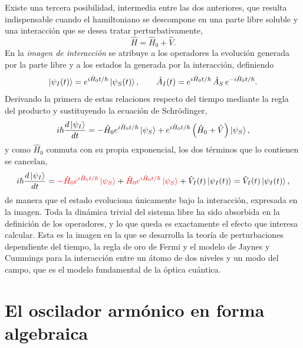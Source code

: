         Existe una tercera posibilidad, intermedia entre las dos anteriores, que resulta indispensable cuando el hamiltoniano se descompone en una parte libre soluble y una interacción que se desea tratar perturbativamente,
        \begin{equation}\label{eq:HamiltonianoDividido}
            \hat{H} = \hat{H}_{0} + \hat{V} .
        \end{equation}
        En la \textit{imagen de interacción} se atribuye a los operadores la evolución generada por la parte libre y a los estados la generada por la interacción, definiendo
        \begin{equation}\label{eq:ImagenInteraccion}
            \ket{\psi_{I}(t)} = e^{i\hat{H}_{0}t/\hbar}\ket{\psi_{S}(t)},
            \qquad
            \hat{A}_{I}(t) = e^{i\hat{H}_{0}t/\hbar}\,\hat{A}_{S}\,e^{-i\hat{H}_{0}t/\hbar} .
        \end{equation}
        Derivando la primera de estas relaciones respecto del tiempo mediante la regla del producto y sustituyendo la ecuación de Schrödinger,
        \begin{equation}\label{eq:EcuacionInteraccion1}
            i\hbar\frac{d\ket{\psi_{I}}}{dt} = -\hat{H}_{0}e^{i\hat{H}_{0}t/\hbar}\ket{\psi_{S}} + e^{i\hat{H}_{0}t/\hbar}\left(\hat{H}_{0}+\hat{V}\right)\ket{\psi_{S}},
        \end{equation}
        y como $\hat{H}_{0}$ conmuta con su propia exponencial, los dos términos que lo contienen se cancelan,
        \begin{equation}\label{eq:EcuacionInteraccion2}
            i\hbar\frac{d\ket{\psi_{I}}}{dt} = \textcolor{red}{-\hat{H}_{0}e^{i\hat{H}_{0}t/\hbar}\ket{\psi_{S}}} + \textcolor{red}{\hat{H}_{0}e^{i\hat{H}_{0}t/\hbar}\ket{\psi_{S}}} + \hat{V}_{I}(t)\ket{\psi_{I}(t)} = \hat{V}_{I}(t)\ket{\psi_{I}(t)},
        \end{equation}
        de manera que el estado evoluciona únicamente bajo la interacción, expresada en la imagen. Toda la dinámica trivial del sistema libre ha sido absorbida en la definición de los operadores, y lo que queda es exactamente el efecto que interesa calcular. Esta es la imagen en la que se desarrolla la teoría de perturbaciones dependiente del tiempo, la regla de oro de Fermi y el modelo de Jaynes y Cummings para la interacción entre un átomo de dos niveles y un modo del campo, que es el modelo fundamental de la óptica cuántica.

\section{El oscilador armónico en forma algebraica}

